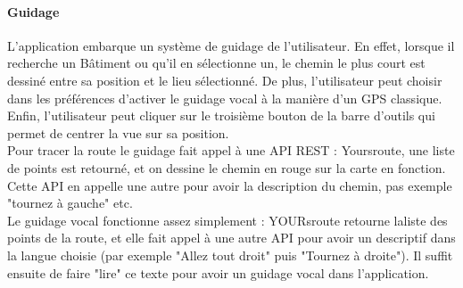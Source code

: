 \documentclass{article}
\begin{document}
	\paragraph{Guidage}
	L'application embarque un système de guidage de l'utilisateur. En effet, lorsque il recherche un Bâtiment ou qu'il en sélectionne un, le chemin le plus court est dessiné entre sa position et le lieu sélectionné. De plus, l'utilisateur peut choisir dans les préférences d'activer le guidage vocal à la manière d'un GPS classique. \\
	Enfin, l'utilisateur peut cliquer sur le troisième bouton de la barre d'outils qui permet de centrer la vue sur sa position. \\
	Pour tracer la route le guidage fait appel à une API REST : Yoursroute, une liste de points est retourné, et on dessine le chemin en rouge sur la carte en fonction. Cette API en appelle une autre pour avoir la description du chemin, pas exemple "tournez à gauche" etc.\\
	Le guidage vocal fonctionne assez simplement : YOURsroute retourne laliste des points de la route, et elle fait appel à une autre API pour avoir un descriptif dans la langue choisie (par exemple "Allez tout droit" puis "Tournez à droite").
	Il suffit ensuite de faire "lire" ce texte pour avoir un guidage vocal dans l'application. \\
	
\end{document}
